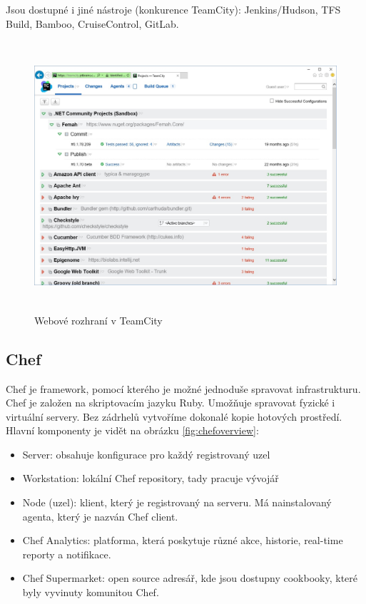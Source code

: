 Jsou dostupné i jiné nástroje (konkurence TeamCity): Jenkins/Hudson, TFS Build, Bamboo, CruiseControl, GitLab. \cite{TeamCity}

\begin{figure}[]
  \centering
  \includegraphics[height=10cm]{fig/teamcity_overview.jpg}
  \caption{Webové rozhraní v TeamCity}
  \label{fig:teamcityoverview}
\end{figure}

\subsection{Chef}
Chef je framework, pomocí kterého je možné jednoduše spravovat infrastrukturu. Chef je založen na skriptovacím jazyku Ruby. Umožňuje spravovat fyzické i virtuální servery. Bez zádrhelů vytvoříme dokonalé kopie hotových prostředí. Hlavní komponenty je vidět na obrázku \ref{fig:chefoverview}:

\begin{itemize}
\item Server: obsahuje konfigurace pro každý registrovaný uzel
\item Workstation: lokální Chef repository, tady pracuje vývojář
\item Node (uzel): klient, který je registrovaný na serveru. Má nainstalovaný agenta, který je nazván Chef client.
\item Chef Analytics: platforma, která poskytuje různé akce, historie, real-time reporty a notifikace.
\item Chef Supermarket: open source adresář, kde jsou dostupny cookbooky, které byly vyvinuty komunitou Chef.
\end{itemize}

